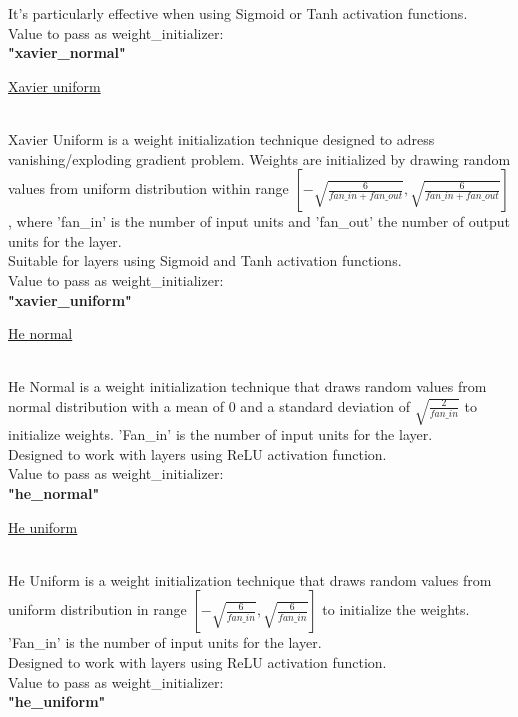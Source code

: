 \documentclass{article}
\begin{document}
It's particularly effective when using Sigmoid or Tanh activation functions. \\

Value to pass as weight\_initializer: \\
\textbf{"xavier\_normal"}
\pagebreak

\hypertarget{initialization_xavier_uniform}{\underline{Xavier uniform}} \\

Xavier Uniform is a weight initialization technique designed to adress vanishing/exploding 
gradient problem. Weights are initialized by drawing random values from uniform distribution 
within range $\left[-\sqrt{\frac{6}{fan\_in + fan\_out}}, \sqrt{\frac{6}{fan\_in + fan\_out}}\right]$,
where 'fan\_in' is the number of input units and 'fan\_out' the number of output units for the layer. \\

Suitable for layers using Sigmoid and Tanh activation functions. \\

Value to pass as weight\_initializer: \\
\textbf{"xavier\_uniform"}
\pagebreak

\hypertarget{initialization_he_normal}{\underline{He normal}} \\

He Normal is a weight initialization technique that draws random values 
from normal distribution with a mean of 0 and a standard deviation of 
$\sqrt{\frac{2}{fan\_in}}$ to initialize weights. 'Fan\_in' is the number 
of input units for the layer. \\

Designed to work with layers using ReLU activation function. \\

Value to pass as weight\_initializer: \\
\textbf{"he\_normal"}
\pagebreak

\hypertarget{initialization_he_uniform}{\underline{He uniform}} \\

He Uniform is a weight initialization technique that draws random values 
from uniform distribution in range $\left[ -\sqrt{\frac{6}{fan\_in}}, \sqrt{\frac{6}{fan\_in}} \right]$ 
to initialize the weights. 'Fan\_in' is the number of input units for the layer. \\

Designed to work with layers using ReLU activation function. \\

Value to pass as weight\_initializer: \\
\textbf{"he\_uniform"}
\pagebreak
\end{document}
